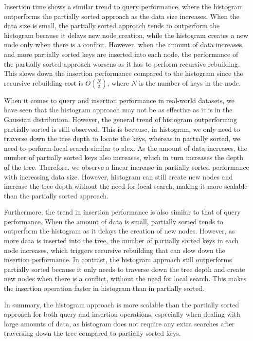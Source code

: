 \documentclass[11pt,a4paper]{article}
\begin{document}
Insertion time shows a similar trend to query performance, where the histogram outperforms the partially sorted approach as the data size increases. When the data size is small, the partially sorted approach tends to outperform the histogram because it delays new node creation, while the histogram creates a new node only when there is a conflict. However, when the amount of data increases, and more partially sorted keys are inserted into each node, the performance of the partially sorted approach worsens as it has to perform recursive rebuilding. This slows down the insertion performance compared to the histogram since the recursive rebuilding cost is $O(\frac{N}{2})$, where $N$ is the number of keys in the node.

When it comes to query and insertion performance in real-world datasets, we have seen that the histogram approach may not be as effective as it is in the Gaussian distribution. However, the general trend of histogram outperforming partially sorted is still observed. This is because, in histogram, we only need to traverse down the tree depth to locate the keys, whereas in partially sorted, we need to perform local search similar to \acrshort{alex}\cite{ALEX}. As the amount of data increases, the number of partially sorted keys also increases, which in turn increases the depth of the tree. Therefore, we observe a linear increase in partially sorted performance with increasing data size. However, histogram can still create new nodes and increase the tree depth without the need for local search, making it more scalable than the partially sorted approach.

Furthermore, the trend in insertion performance is also similar to that of query performance. When the amount of data is small, partially sorted tends to outperform the histogram as it delays the creation of new nodes. However, as more data is inserted into the tree, the number of partially sorted keys in each node increases, which triggers recursive rebuilding that can slow down the insertion performance. In contrast, the histogram approach still outperforms partially sorted because it only needs to traverse down the tree depth and create new nodes when there is a conflict, without the need for local search. This makes the insertion operation faster in histogram than in partially sorted.

In summary, the histogram approach is more scalable than the partially sorted approach for both query and insertion operations, especially when dealing with large amounts of data, as histogram does not require any extra searches after traversing down the tree compared to partially sorted keys.
\end{document}

